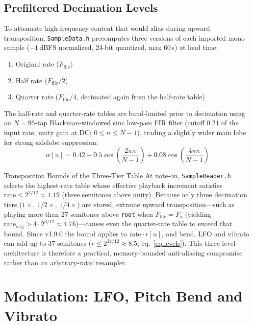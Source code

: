 \documentclass[11pt,letterpaper]{article}
\newcommand{\code}[1]{\texttt{\textcolor{codegray}{#1}}}
\newcommand{\Fs}{F_s}
\begin{document}
\subsection{Prefiltered Decimation Levels}

To attenuate high-frequency content that would alias during upward transposition, \code{SampleData.h} precomputes
three versions of each imported mono sample ($-1$\,dBFS normalized, 24-bit quantized, max 60\,s) at load time:
\begin{enumerate}[leftmargin=1.6em, itemsep=0pt, topsep=2pt]
  \item Original rate ($F_{\mathrm{file}}$)
  \item Half rate ($F_{\mathrm{file}}/2$)
  \item Quarter rate ($F_{\mathrm{file}}/4$, decimated again from the half-rate table)
\end{enumerate}
The half-rate and quarter-rate tables are band-limited prior to decimation using an $N = 95$-tap Blackman-windowed
sinc low-pass FIR filter (cutoff $0.21$ of the input rate, unity gain at DC; $0 \le n \le N-1$), trading a slightly wider main lobe for strong sidelobe suppression:
\begin{equation}\label{eq:blackman}
  w[n] = 0.42 - 0.5\cos\!\left(\frac{2\pi n}{N-1}\right) + 0.08\cos\!\left(\frac{4\pi n}{N-1}\right)
\end{equation}

\begin{callout}{Transposition Bounds of the Three-Tier Table}
At note-on, \code{SampleReader.h} selects the highest-rate table whose effective playback increment satisfies
$\mathrm{rate} \le 2^{3/12} \approx 1.19$ (three semitones above unity). Because only three decimation tiers ($1\times$, $1/2\times$, $1/4\times$) are stored, extreme upward
transposition---such as playing more than 27 semitones above \code{root} when $F_{\mathrm{file}} = \Fs$ (yielding $\mathrm{rate}_{\mathrm{orig}} > 4 \cdot 2^{3/12} \approx 4.76$)---causes even the
quarter-rate table to exceed that bound. Since v1.9.0 the bound applies to $\mathrm{rate}\cdot r[n]$, and bend, LFO and vibrato can add up to 37 semitones
($r \le 2^{37/12} \approx 8.5$; eq.~\eqref{eq:levels}). This three-level architecture is therefore a practical, memory-bounded
anti-aliasing compromise rather than an arbitrary-ratio resampler.
\end{callout}

\newpage
\section{Modulation: LFO, Pitch Bend and Vibrato}\label{sec:mod}
\setlength{\abovedisplayskip}{4pt plus 1pt minus 1pt}\setlength{\belowdisplayskip}{4pt plus 1pt minus 1pt}
\setlength{\abovedisplayshortskip}{2pt plus 1pt}\setlength{\belowdisplayshortskip}{4pt plus 1pt minus 1pt}
\end{document}
